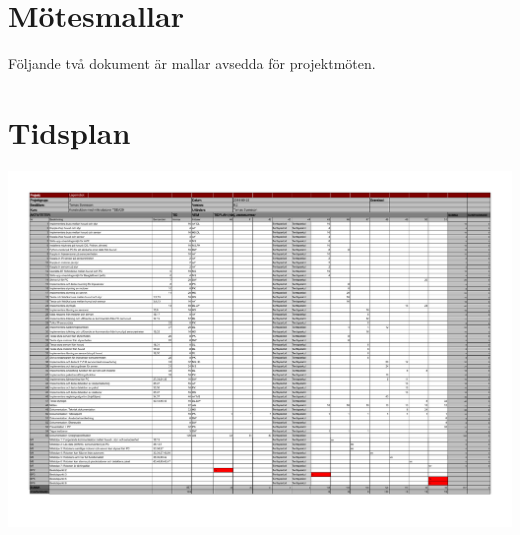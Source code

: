 \documentclass[titlepage, a4paper]{article}
\begin{document}
\newpage
\begin{appendices}


\section{Mötesmallar} \label{ap:motesmall}
Följande två dokument är mallar avsedda för projektmöten. 






\newpage
\section{Tidsplan}
\center
\includegraphics[angle=90, scale=0.7]{../tidsplan/tidsplan_v0.2.pdf}


\end{appendices}
\end{document}
